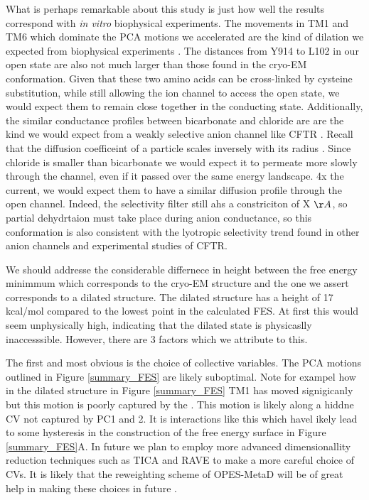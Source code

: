 What is perhaps remarkable about this study is just how well the results correspond with \textit{in vitro} biophysical experiments. The movements in TM1 and TM6 which dominate the PCA motions we accelerated are the kind of dilation we expected from biophysical experiments \cite{linsdell2016}. The distances from Y914 to L102 in our open state are also not much larger than those found in the cryo-EM conformation. Given that these two amino acids can be cross-linked by cysteine substitution, while still allowing the ion channel to access the open state, we would expect them to remain close together in the conducting state\cite{negoda2019}. Additionally, the similar conductance profiles between bicarbonate and chloride are are the kind we would expect from a weakly selective anion channel like CFTR \cite{}. Recall that the diffusion coefficeint of a particle scales inversely with its radius \cite{}. Since chloride is smaller than bicarbonate we would expect it to permeate more slowly through the channel, even if it passed over the same energy landscape. 4x the current, we would expect them to have a similar diffusion profile through the open channel. Indeed, the selectivity filter still ahs a constriciton of X $\AA$, so partial dehydrtaion must take place during anion conductance, so this conformation is also consistent with the lyotropic selectivity trend found in other anion channels and experimental studies of CFTR. 

We should addresse the considerable differnece in height between the  free energy minimmum which corresponds to the cryo-EM structure and the one we assert corresponds to a dilated structure. The dilated structure has a height of 17 kcal/mol compared to the lowest point in the calculated FES. At first this would seem unphysically high, indicating that the dilated state is physicaslly inaccesssible. However, there are 3 factors which we attribute to this. 

The first and most obvious is the choice of collective variables. The PCA motions outlined in Figure \ref{summary_FES} are likely suboptimal. Note for exampel how in the dilated structure in Figure \ref{summary_FES} TM1 has moved signigicanly but this motion is poorly captured by the . This motion is likely along a hiddne CV  not captured by PC1 and 2. It is interactions like this which havel ikely lead to some hysteresis in the construction of the free energy surface in Figure \ref{summary_FES}A. In future we plan to employ more advanced dimensionallity reduction techniques such as TICA and RAVE \cite{} to make a more careful choice of CVs. It is likely that the reweighting scheme of OPES-MetaD will be of great help in making these choices in future \cite{}. 


